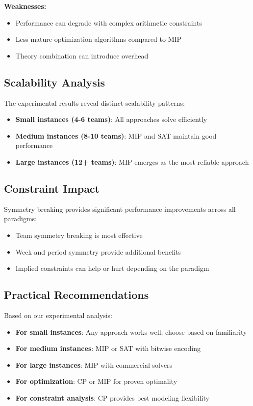 \documentclass[11pt]{article}
\begin{document}
\begin{itemize}
\textbf{Weaknesses:}
\begin{itemize}
    \item Performance can degrade with complex arithmetic constraints
    \item Less mature optimization algorithms compared to MIP
    \item Theory combination can introduce overhead
\end{itemize}

\subsection{Scalability Analysis}

The experimental results reveal distinct scalability patterns:

\begin{itemize}
    \item \textbf{Small instances (4-6 teams)}: All approaches solve efficiently
    \item \textbf{Medium instances (8-10 teams)}: MIP and SAT maintain good performance
    \item \textbf{Large instances (12+ teams)}: MIP emerges as the most reliable approach
\end{itemize}

\subsection{Constraint Impact}

Symmetry breaking provides significant performance improvements across all paradigms:
\begin{itemize}
    \item Team symmetry breaking is most effective
    \item Week and period symmetry provide additional benefits
    \item Implied constraints can help or hurt depending on the paradigm
\end{itemize}

\subsection{Practical Recommendations}

Based on our experimental analysis:

\begin{itemize}
    \item \textbf{For small instances}: Any approach works well; choose based on familiarity
    \item \textbf{For medium instances}: MIP or SAT with bitwise encoding
    \item \textbf{For large instances}: MIP with commercial solvers
    \item \textbf{For optimization}: CP or MIP for proven optimality
    \item \textbf{For constraint analysis}: CP provides best modeling flexibility
\end{itemize}


\end{itemize}
\end{document}
